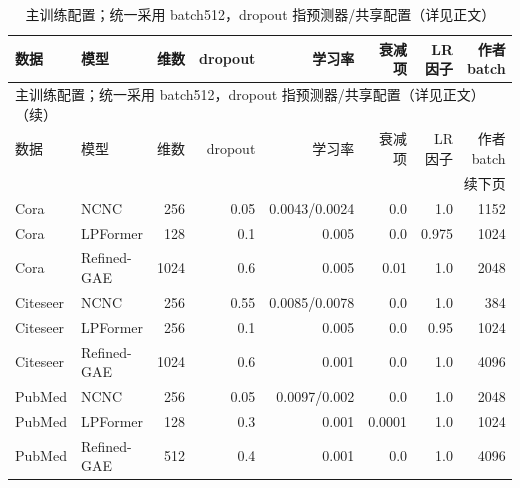 {\footnotesize
\setlength{\tabcolsep}{3.2pt}
\renewcommand{\arraystretch}{1.10}
\begin{longtable}{llrrrrrr}
\caption{主训练配置；统一采用 batch512，dropout 指预测器/共享配置（详见正文）}\\
\toprule
数据 & 模型 & 维数 & dropout & 学习率 & 衰减项 & LR因子 & 作者batch \\
\midrule
\endfirsthead
\multicolumn{8}{l}{主训练配置；统一采用 batch512，dropout 指预测器/共享配置（详见正文）（续）}\\
\toprule
数据 & 模型 & 维数 & dropout & 学习率 & 衰减项 & LR因子 & 作者batch \\
\midrule
\endhead
\midrule\multicolumn{8}{r}{续下页}\\
\endfoot
\bottomrule
\endlastfoot
Cora & NCNC & 256 & 0.05 & 0.0043/0.0024 & 0.0 & 1.0 & 1152 \\
Cora & LPFormer & 128 & 0.1 & 0.005 & 0.0 & 0.975 & 1024 \\
Cora & Refined-GAE & 1024 & 0.6 & 0.005 & 0.01 & 1.0 & 2048 \\
Citeseer & NCNC & 256 & 0.55 & 0.0085/0.0078 & 0.0 & 1.0 & 384 \\
Citeseer & LPFormer & 256 & 0.1 & 0.005 & 0.0 & 0.95 & 1024 \\
Citeseer & Refined-GAE & 1024 & 0.6 & 0.001 & 0.0 & 1.0 & 4096 \\
PubMed & NCNC & 256 & 0.05 & 0.0097/0.002 & 0.0 & 1.0 & 2048 \\
PubMed & LPFormer & 128 & 0.3 & 0.001 & 0.0001 & 1.0 & 1024 \\
PubMed & Refined-GAE & 512 & 0.4 & 0.001 & 0.0 & 1.0 & 4096 \\
\end{longtable}
}
